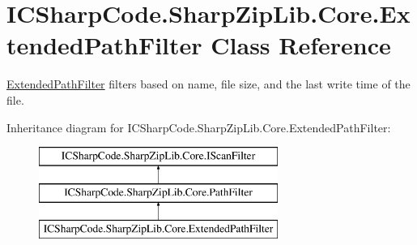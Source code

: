 \hypertarget{class_i_c_sharp_code_1_1_sharp_zip_lib_1_1_core_1_1_extended_path_filter}{}\section{I\+C\+Sharp\+Code.\+Sharp\+Zip\+Lib.\+Core.\+Extended\+Path\+Filter Class Reference}
\label{class_i_c_sharp_code_1_1_sharp_zip_lib_1_1_core_1_1_extended_path_filter}


\hyperlink{class_i_c_sharp_code_1_1_sharp_zip_lib_1_1_core_1_1_extended_path_filter}{Extended\+Path\+Filter} filters based on name, file size, and the last write time of the file.  


Inheritance diagram for I\+C\+Sharp\+Code.\+Sharp\+Zip\+Lib.\+Core.\+Extended\+Path\+Filter\+:\begin{figure}[H]
\begin{center}
\leavevmode
\includegraphics[height=3.000000cm]{class_i_c_sharp_code_1_1_sharp_zip_lib_1_1_core_1_1_extended_path_filter}
\end{center}
\end{figure}
